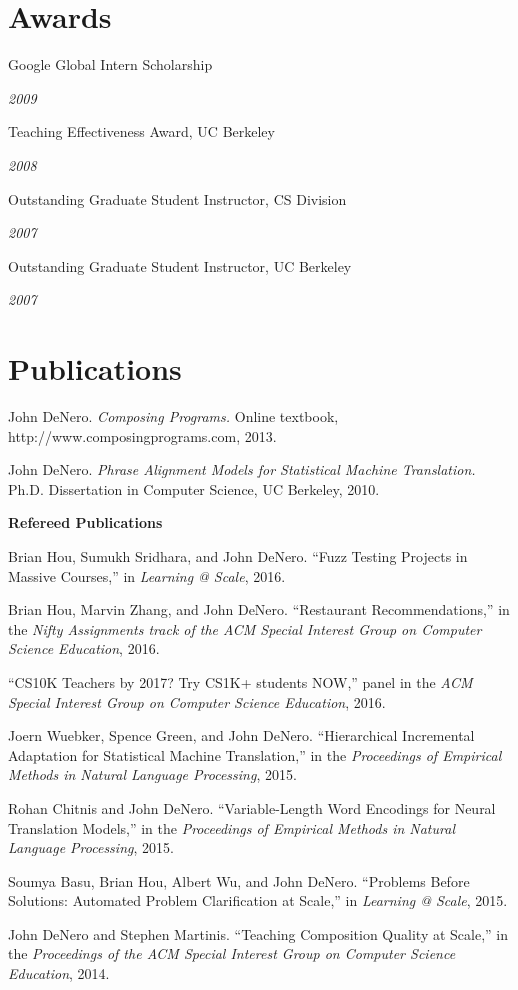 \documentclass[margin,line]{res}
\newcommand{\dated}[2]{\parbox[t]{4.4in}{#1} \hspace{0.4in}
											 \parbox[t]{1in}{ {\it #2 } } }
\begin{document}
\begin{resume}
\section{\sc Awards}

	\dated{Google Global Intern Scholarship} { 2009 }

	\dated{Teaching Effectiveness Award, UC Berkeley} { 2008 }

	\dated{Outstanding Graduate Student Instructor, CS Division} { 2007 }

	\dated{Outstanding Graduate Student Instructor, UC Berkeley} { 2007 }

\section{\sc Publications}

John DeNero. {\it Composing Programs.} Online textbook,
http://www.composingprograms.com, 2013.

John DeNero. {\it Phrase Alignment Models for Statistical Machine Translation.}
Ph.D. Dissertation in Computer Science, UC Berkeley, 2010.

{\bf Refereed Publications }

Brian Hou, Sumukh Sridhara, and John DeNero. ``Fuzz Testing Projects in Massive Courses,'' in {\it Learning @ Scale}, 2016.

Brian Hou, Marvin Zhang, and John DeNero. ``Restaurant Recommendations,'' in the {\it Nifty Assignments track of the ACM Special Interest Group on Computer Science Education}, 2016.

``CS10K Teachers by 2017?  Try CS1K+ students NOW,'' panel in the {\it ACM Special Interest Group on Computer Science Education}, 2016.

Joern Wuebker, Spence Green, and John DeNero. ``Hierarchical Incremental Adaptation for Statistical Machine Translation,'' in the {\it Proceedings of Empirical Methods in Natural Language Processing}, 2015.

Rohan Chitnis and John DeNero. ``Variable-Length Word Encodings for Neural Translation Models,'' in the {\it Proceedings of Empirical Methods in Natural Language Processing}, 2015.

Soumya Basu, Brian Hou, Albert Wu, and John DeNero. ``Problems Before Solutions: Automated Problem Clarification at Scale,'' in {\it Learning @ Scale}, 2015.

John DeNero and Stephen Martinis.  ``Teaching Composition Quality at Scale,'' in the {\it Proceedings of the ACM Special Interest Group on Computer Science Education}, 2014.


\end{resume}
\end{document}
